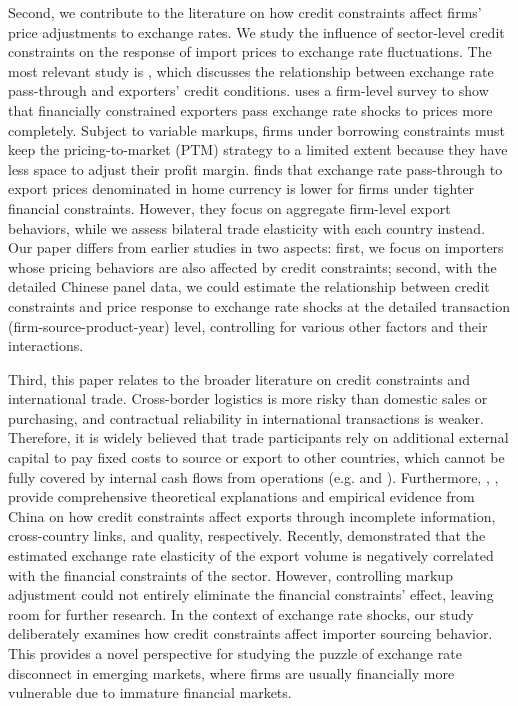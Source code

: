 Second, we contribute to the literature on how credit constraints affect firms' price adjustments to exchange rates. We study the influence of sector-level credit constraints on the response of import prices to exchange rate fluctuations. The most relevant study is \cite{strasser2013}, which discusses the relationship between exchange rate pass-through and exporters' credit conditions. \cite{strasser2013} uses a firm-level survey to show that financially constrained exporters pass exchange rate shocks to prices more completely. Subject to variable markups, firms under borrowing constraints must keep the pricing-to-market (PTM) strategy to a limited extent because they have less space to adjust their profit margin. \cite{dai2021} finds that exchange rate pass-through to export prices denominated in home currency is lower for firms under tighter financial constraints. However, they focus on aggregate firm-level export behaviors, while we assess bilateral trade elasticity with each country instead. Our paper differs from earlier studies in two aspects: first, we focus on importers whose pricing behaviors are also affected by credit constraints; second, with the detailed Chinese panel data, we could estimate the relationship between credit constraints and price response to exchange rate shocks at the detailed transaction (firm-source-product-year) level, controlling for various other factors and their interactions.

Third, this paper relates to the broader literature on credit constraints and international trade. Cross-border logistics is more risky than domestic sales or purchasing, and contractual reliability in international transactions is weaker. Therefore, it is widely believed that trade participants rely on additional external capital to pay fixed costs to source or export to other countries, which cannot be fully covered by internal cash flows from operations (e.g. \cite{manova2013} and \cite{chaney2016}). Furthermore, \cite{feenstra-li-yu2014}, \cite{manova-wei-zhang2015}, \cite{fan-lai-li2015} provide comprehensive theoretical explanations and empirical evidence from China on how credit constraints affect exports through incomplete information, cross-country links, and quality, respectively. Recently, \cite{xu-guo2021} demonstrated that the estimated exchange rate elasticity of the export volume is negatively correlated with the financial constraints of the sector. However, controlling markup adjustment could not entirely eliminate the financial constraints' effect, leaving room for further research. In the context of exchange rate shocks, our study deliberately examines how credit constraints affect importer sourcing behavior. This provides a novel perspective for studying the puzzle of exchange rate disconnect in emerging markets, where firms are usually financially more vulnerable due to immature financial markets.

